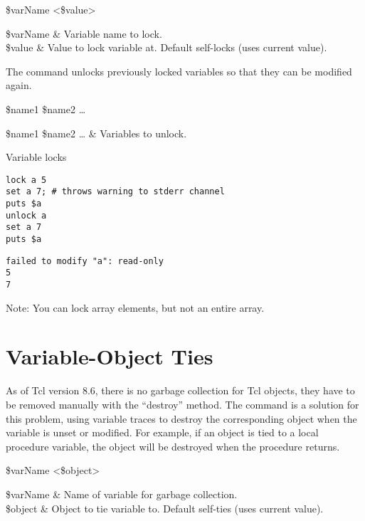 \documentclass{article}
\begin{document}
\begin{syntax}
 \$varName <\$value>
\end{syntax}
\begin{args}
\$varName & Variable name to lock.  \\
\$value & Value to lock variable at. Default self-locks (uses current value).
\end{args}

The command  unlocks previously locked variables so that they can be modified again.
\begin{syntax}
 \$name1 \$name2 …
\end{syntax}
\begin{args}
\$name1 \$name2 … & Variables to unlock.
\end{args}

\begin{example}{Variable locks}
\begin{lstlisting}
lock a 5
set a 7; # throws warning to stderr channel
puts $a
unlock a
set a 7
puts $a
\end{lstlisting}
\tcblower
\begin{lstlisting}
failed to modify "a": read-only
5
7
\end{lstlisting}
\end{example}

Note: You can lock array elements, but not an entire array.

\clearpage

\section{Variable-Object Ties}
As of Tcl version 8.6, there is no garbage collection for Tcl objects, they have to be removed manually with the ``destroy'' method. 
The command  is a solution for this problem, using variable traces to destroy the corresponding object when the variable is unset or modified. 
For example, if an object is tied to a local procedure variable, the object will be destroyed when the procedure returns.

\begin{syntax}
 \$varName <\$object>
\end{syntax}
\begin{args}
\$varName & Name of variable for garbage collection. \\
\$object & Object to tie variable to. Default self-ties (uses current value).
\end{args}
\end{document}
